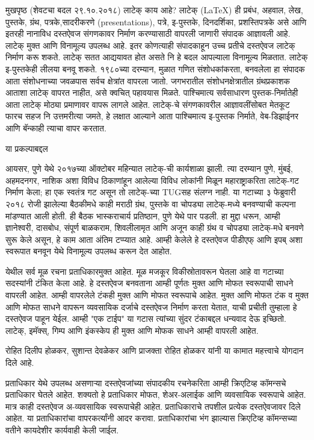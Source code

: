 \documentclass[17pt]{extarticle}
\begin{document}
मुखपृष्ठ
(शेवटचा बदल २९.१०.२०१८)
लाटेक् काय आहे?
लाटेक् (LaTeX) ही प्रबंध, अहवाल, लेख, पुस्तके, ग्रंथ, पत्रके,सादरीकरणे  (presentations), पत्रे, इ-पुस्तके, दिनदर्शिका, प्रशस्तिपत्रके असे आणि इतरही नानाविध दस्तऐवज संगणकावर निर्माण करण्यासाठी वापरली जाणारी संपादक आज्ञावली आहे. लाटेक् मुक्त आणि विनामूल्य उपलब्ध आहे. इतर कोणत्याही संपादकाहून उच्च प्रतीचे दस्तऐवज लाटेक् निर्माण करू शकते.   लाटेक् सतत आद्ययावत होत असते नि हे बदल आपल्याला विनामूल्य मिळतात. लाटेक् इ-पुस्तकेही लीलया बनवू शकते. १९८०च्या दरम्यान,  मुळात गणित संशोधकांकरता, बनवलेला हा संपादक आता संशोधनाच्या जवळपास सर्वच क्षेत्रांत वापरला जातो. जगभरातील संशोधनक्षेत्रातील ग्रंथप्रकाशक आताशा लाटेक् वापरत नाहीत, असे क्वचित् पहावयास मिळते. पाश्चिमात्य सर्वसाधारण पुस्तक-निर्मातेही आता लाटेक् मोठ्या प्रमाणावर वापरू लागले आहेत. लाटेक्-चे संगणकावरील आज्ञावलींसोबत मेतकूट फारच सहज नि उत्तमरीत्या जमते, हे लक्षात आल्याने आता पाश्चिमात्य इ-पुस्तक निर्माते, वेब-डिझाईनर आणि बॅन्काही त्याचा वापर करतात.

या प्रकल्पाबद्दल

आयसर, पुणे येथे २०१७च्या ऑक्टोबर महिन्यात लाटेक्-ची कार्यशाळा झाली. त्या दरम्यान पुणे, मुंबई, अहमदनगर, नाशिक अशा विविध ठिकाणांहून आलेल्या विविध लोकांनी मिळून महाराष्ट्राकरिता लाटेक्-गट निर्माण केला; हा एक स्वतंत्र गट असून तो लाटेक्-च्या TUGसह संलग्न नाही. या गटाच्या ३ फेब्रुवारी २०१८ रोजी झालेल्या बैठकीमधे काही मराठी ग्रंथ, पुस्तके वा चोपड्या लाटेक्-मध्ये बनवण्याची कल्पना मांडण्यात आली होती. ही बैठक भास्कराचार्य प्रतिष्ठान, पुणे येथे पार पडली. हा मुद्दा धरून, आम्ही ज्ञानेश्वरी, दासबोध, संपूर्ण बाळकराम, शिवलीलामृत आणि अजून काही ग्रंथ व चोपड्या लाटेक्-मधे बनवणे सुरू केले असून, हे काम आता अंतिम टप्प्यात आहे. आम्ही केलेले हे दस्तऐवज पीडीएफ् आणि इपब् अशा स्वरूपात बनवून येथे विनामूल्य उपलब्ध करून देत आहोत.

येथील सर्व मूळ रचना प्रताधिकारमुक्त आहेत. मूळ मजकूर विकीस्रोतावरून घेतला आहे वा गटाच्या सदस्यांनी टंकित केला आहे. हे दस्तऐवज बनवताना आम्ही पूर्णतः मुक्त आणि मोफत स्वरूपाची साधने वापरली आहेत. आम्ही वापरलेले टंकही मुक्त आणि मोफत स्वरूपाचे आहेत. मुक्त आणि मोफत टंक व मुक्त आणि मोफत साधने वापरून व्यवसायिक दर्जाचे दस्तऐवज निर्माण करता येतात, याची प्रचीती तुम्हाला हे दस्तऐवज पाहून येईल. आम्ही "एक टाईप" या गटास त्यांच्या सुंदर टंकाबद्दल धन्यवाद देऊ इच्छितो. लाटेक्, इमॅक्स्, गिम्प आणि इंकस्केप ही मुक्त आणि मोफक साधने आम्ही वापरली आहेत.

रोहित दिलीप होळकर, सुशान्त देवळेकर आणि प्राजक्ता रोहित होळकर यांनी या कामात महत्त्वाचे योगदान दिले आहे.

प्रताधिकार
येथे उपलब्ध असणाऱ्या दस्तऐवजांच्या संपादकीय रचनेकरिता आम्ही क्रिएटिव्ह कॉमन्सचे प्रताधिकार घेतले आहेत. शक्यतो हे प्रताधिकार मोफत, शेअर-अलाईक आणि व्यवसायिक स्वरूपाचे आहेत. मात्र काही दस्तऐवज अ-व्यवसायिक स्वरूपाचेही आहेत. प्रताधिकाराचे तपशील प्रत्येक दस्तऐवजावर दिले आहेत. या प्रताधिकारांचा वापरकर्त्यांनी आदर करावा. प्रताधिकारांचा भंग झाल्यास क्रिएटिव्ह कॉमन्सच्या वतीने कायदेशीर कार्यवाही केली जाईल.
\end{document}
